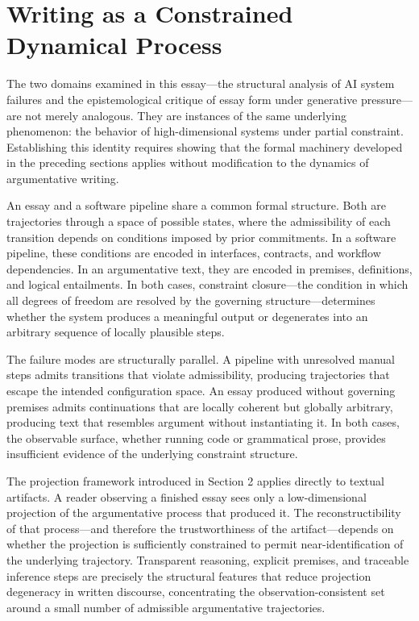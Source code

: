 \documentclass[12pt, oneside]{article}
\theoremstyle{plain}
\theoremstyle{definition}
\theoremstyle{remark}
\begin{document}
\section{Writing as a Constrained Dynamical Process}

The two domains examined in this essay---the structural analysis of AI system failures and
the epistemological critique of essay form under generative pressure---are not merely
analogous. They are instances of the same underlying phenomenon: the behavior of
high-dimensional systems under partial constraint. Establishing this identity requires
showing that the formal machinery developed in the preceding sections applies without
modification to the dynamics of argumentative writing.

An essay and a software pipeline share a common formal structure. Both are trajectories
through a space of possible states, where the admissibility of each transition depends on
conditions imposed by prior commitments. In a software pipeline, these conditions are
encoded in interfaces, contracts, and workflow dependencies. In an argumentative text, they
are encoded in premises, definitions, and logical entailments. In both cases, constraint
closure---the condition in which all degrees of freedom are resolved by the governing
structure---determines whether the system produces a meaningful output or degenerates into
an arbitrary sequence of locally plausible steps.

The failure modes are structurally parallel. A pipeline with unresolved manual steps admits
transitions that violate admissibility, producing trajectories that escape the intended
configuration space. An essay produced without governing premises admits continuations that
are locally coherent but globally arbitrary, producing text that resembles argument without
instantiating it. In both cases, the observable surface, whether running code or grammatical
prose, provides insufficient evidence of the underlying constraint structure.

The projection framework introduced in Section 2 applies directly to textual artifacts.
A reader observing a finished essay sees only a low-dimensional projection of the
argumentative process that produced it. The reconstructibility of that process---and therefore
the trustworthiness of the artifact---depends on whether the projection is sufficiently
constrained to permit near-identification of the underlying trajectory. Transparent reasoning,
explicit premises, and traceable inference steps are precisely the structural features that
reduce projection degeneracy in written discourse, concentrating the observation-consistent
set around a small number of admissible argumentative trajectories.
\end{document}
